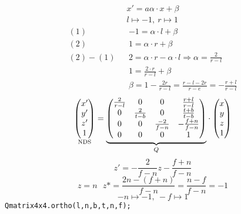 \begin{align*}
x' = a\alpha \cdot x + \beta\\
l \mapsto -1, ~ r\mapsto 1
\end{align*}
\begin{align*}
(1)&&-1 = \alpha\cdot l + \beta\\
(2)&& 1 = \alpha\cdot r + \beta\\
\hline
(2) - (1)&& 2 = \alpha\cdot r -\alpha\cdot l \Rightarrow \alpha = \frac{2}{r-l}\\
&&1 = \frac{2\cdot r}{r - l}+\beta\\
&&\beta = 1 - \frac{2r}{r-l} = \frac{r-l-2r}{r-e} = -\frac{r+l}{r-l}
\end{align*}
\[ \underset{\text{NDS}}{\begin{pmatrix}x'\\y'\\z'\\1\end{pmatrix}} = \underset{Q}{\underbrace{\begin{pmatrix}\frac{2}{r-l}&0&0&\frac{r+l}{r-l}\\0&\frac{2}{t-b}&0&\frac{t+b}{t-b}\\0&0&\frac{-2}{f-n}&-\frac{f+n}{f-n}\\0&0&0&1   \end{pmatrix}}}\cdot\begin{pmatrix}x\\y\\z\\1\end{pmatrix} \]
\[  z' = -\frac{2}{f-n}z - \frac{f+n}{f-n}  \]
\[ z=n~~~z* = \frac{2n-(f+n)}{f-n} = \frac{n-f}{f-n} = -1 \]
\[ -n\mapsto -1,~-f\mapsto 1\]
\texttt{Qmatrix4x4.ortho(l,n,b,t,n,f);}
